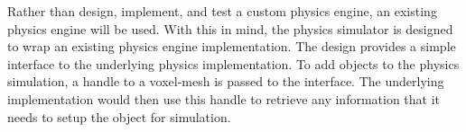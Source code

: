 Rather than design, implement, and test a custom physics engine, an existing physics engine will be
used. With this in mind, the physics simulator is designed to wrap an existing physics engine 
implementation. The design provides a simple interface to the underlying physics implementation. To 
add objects to the physics simulation, a handle to a voxel-mesh is passed to the interface. The 
underlying implementation would then use this handle to retrieve any information that it needs to 
setup the object for simulation. 
